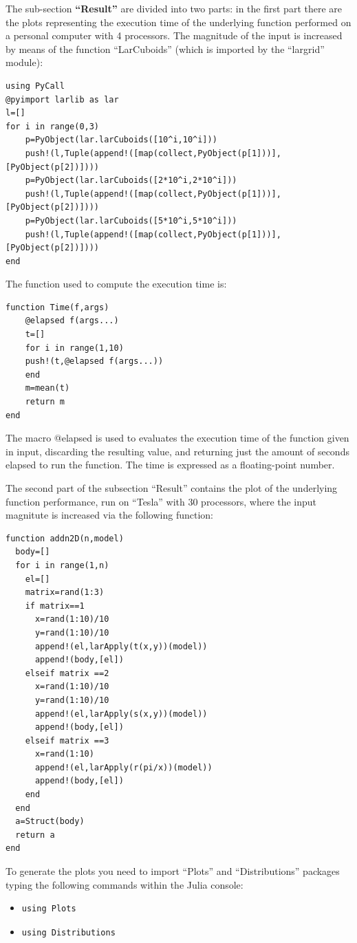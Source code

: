 \documentclass[a4paper,12pt]{article}
\begin{document}
The sub-section \textbf{``Result''} are divided into two parts: in the first part there are the plots representing the execution time of the underlying function performed
on a personal computer with 4 processors. The magnitude of the input is increased by means of the function ``LarCuboids'' (which is imported by the ``largrid'' module):
\begin{Verbatim}[fontsize=\footnotesize]
using PyCall
@pyimport larlib as lar
l=[]
for i in range(0,3)
    p=PyObject(lar.larCuboids([10^i,10^i]))
    push!(l,Tuple(append!([map(collect,PyObject(p[1]))],[PyObject(p[2])])))
    p=PyObject(lar.larCuboids([2*10^i,2*10^i]))
    push!(l,Tuple(append!([map(collect,PyObject(p[1]))],[PyObject(p[2])])))
    p=PyObject(lar.larCuboids([5*10^i,5*10^i]))
    push!(l,Tuple(append!([map(collect,PyObject(p[1]))],[PyObject(p[2])])))
end
\end{Verbatim}
The function used to compute the execution time is:
 \begin{Verbatim}[fontsize=\footnotesize]
function Time(f,args)
    @elapsed f(args...)
    t=[]
    for i in range(1,10)
	push!(t,@elapsed f(args...))
    end
    m=mean(t)
    return m
end
\end{Verbatim}
The macro @elapsed is used to evaluates the execution time of the function given in input, discarding the resulting value, and returning just the amount of seconds elapsed
to run the function. The time is expressed as a floating-point number. 

The second part of the subsection “Result” contains the plot of the underlying function performance, 
run on “Tesla” with 30 processors, where the input magnitute is increased via the following function:
\begin{Verbatim}[fontsize=\footnotesize]
function addn2D(n,model)
  body=[]
  for i in range(1,n)
    el=[]
    matrix=rand(1:3)
    if matrix==1
      x=rand(1:10)/10
      y=rand(1:10)/10
      append!(el,larApply(t(x,y))(model))
      append!(body,[el])
    elseif matrix ==2
      x=rand(1:10)/10
      y=rand(1:10)/10
      append!(el,larApply(s(x,y))(model))
      append!(body,[el])
    elseif matrix ==3
      x=rand(1:10)
      append!(el,larApply(r(pi/x))(model))
      append!(body,[el])
    end
  end
  a=Struct(body)
  return a
end
\end{Verbatim}
To generate the plots you need to import ``Plots'' and ``Distributions'' packages typing the following commands within the Julia console:
\begin{itemize}
 \item 
 \begin{Verbatim}[fontsize=\footnotesize]
  using Plots
 \end{Verbatim}
 \item
 \begin{Verbatim}[fontsize=\footnotesize]
  using Distributions
 \end{Verbatim}
\end{itemize}
\newpage
\end{document}
